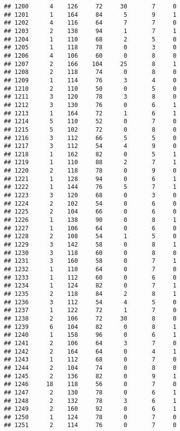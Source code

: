 \documentclass[
]{article}
\begin{document}
\begin{verbatim}
## 1200      4    126     72     30       7     0
## 1201      1    164     84      5       9     1
## 1202      4    116     64      7       7     0
## 1203      2    138     94      1       7     1
## 1204      1    110     68      2       5     0
## 1205      1    118     78      0       3     0
## 1206      4    106     60      0       8     0
## 1207      2    166    104     25       8     1
## 1208      2    118     74      0       8     0
## 1209      1    114     76      3       4     0
## 1210      2    110     50      0       5     0
## 1211      3    120     78      3       8     0
## 1212      3    130     76      0       6     1
## 1213      1    164     72      1       6     1
## 1214      5    110     52      0       7     0
## 1215      5    102     72      0       8     0
## 1216      3    112     66      5       5     0
## 1217      3    112     54      4       9     0
## 1218      1    162     82      0       5     1
## 1219      1    110     88      2       7     1
## 1220      2    118     78      0       9     0
## 1221      1    128     94      0       6     1
## 1222      1    144     76      5       7     1
## 1223      3    120     68      0       3     0
## 1224      2    102     54      0       6     0
## 1225      2    104     66      0       6     0
## 1226      1    138     90      0       8     1
## 1227      1    106     64      0       6     0
## 1228      2    108     54      1       5     0
## 1229      3    142     58      0       8     1
## 1230      3    118     60      0       8     0
## 1231      3    160     58      0       7     1
## 1232      1    110     64      0       7     0
## 1233      1    112     60      0       6     0
## 1234      1    124     82      0       7     1
## 1235      2    118     84      2       8     1
## 1236      3    112     54      4       5     0
## 1237      1    122     72      1       7     0
## 1238      2    106     72     30       8     0
## 1239      6    104     82      0       8     1
## 1240      1    158     96      0       6     1
## 1241      2    106     64      3       7     0
## 1242      2    164     64      0       4     1
## 1243      1    112     68      0       7     0
## 1244      2    104     74      0       8     0
## 1245      2    136     82      0       9     1
## 1246     18    118     56      0       7     0
## 1247      2    130     78      0       6     1
## 1248      2    132     78      3       6     1
## 1249      2    160     92      0       6     1
## 1250      1    124     78      0       7     0
## 1251      2    114     76      0       7     0

\end{verbatim}
\end{document}
